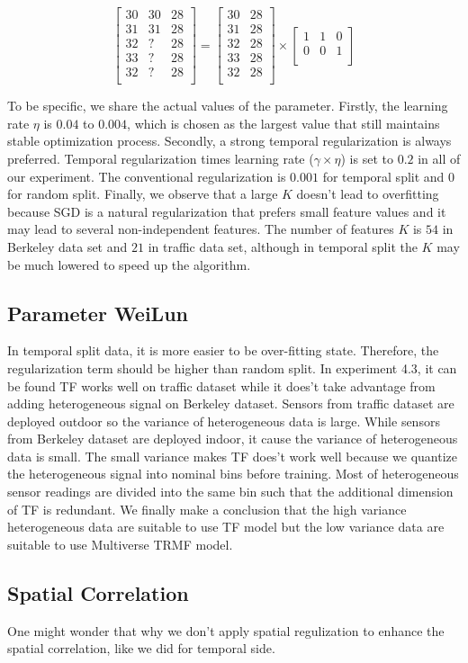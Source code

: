 \begin{equation}
\label{temporalSplit_matrix}
\begin{bmatrix}
30 & 30 & 28\\
31 & 31 & 28\\
32 &  ? & 28\\
33 &  ? & 28\\
32 &  ? & 28\\
\end{bmatrix} 
= 
\begin{bmatrix}
30 & 28\\
31 & 28\\
32 & 28\\
33 & 28\\
32 & 28\\
\end{bmatrix} 
\times
\begin{bmatrix}
1 & 1 & 0\\
0 & 0 & 1\\
\end{bmatrix} 
\end{equation}

To be specific, we share the actual values of the parameter. Firstly, the learning rate $\eta$ is $0.04$ to $0.004$, which is chosen as the largest value that still maintains stable optimization process. Secondly, a strong temporal regularization is always preferred. Temporal regularization times learning rate ($\gamma \times \eta$) is set to $0.2$ in all of our experiment. The conventional regularization is $0.001$ for temporal split and $0$ for random split. Finally, we observe that a large $K$ doesn't lead to overfitting because SGD is a natural regularization that prefers small feature values and it may lead to several non-independent features. The number of features $K$ is $54$ in Berkeley data set and $21$ in traffic data set, although in temporal split the $K$ may be much lowered to speed up the algorithm. 


\subsection{Parameter  WeiLun}
In temporal split data, it is more easier to be over-fitting state. Therefore, the regularization term should be higher than random split.
In experiment 4.3, it can be found TF works well on traffic dataset while it does't take advantage from adding heterogeneous signal on Berkeley dataset. Sensors from traffic dataset are deployed outdoor so the variance of heterogeneous data is large. While sensors from Berkeley dataset are deployed indoor, it cause the variance of heterogeneous data is small. The small variance makes TF does't work well because we quantize the heterogeneous signal into nominal bins before training. Most of heterogeneous sensor readings are divided into the same bin such that the additional dimension of TF is redundant.
We finally make a conclusion that the high variance heterogeneous data are suitable to use TF model but the low variance data are suitable to use Multiverse TRMF model. 

\subsection{Spatial Correlation}
One might wonder that why we don't apply spatial regulization to enhance the spatial correlation, like we did for temporal side.
